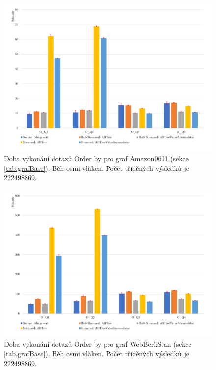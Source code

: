 \begin{figure}[!htp]
\includegraphics[width=\linewidth]{../img/amazonOrderByPar.pdf}\centering
\caption{Doba vykonání dotazů Order by pro graf Amazon0601 (sekce \ref{tab.grafBase}).  Běh osmi vláken. Počet tříděných výsledků je 222498869.}
\label{figure.amazonOrderPar}
\end{figure}

\begin{figure}[!htp]
\includegraphics[width=\linewidth]{../img/webberkstanOrderByPar.pdf}\centering
\caption{Doba vykonání dotazů Order by pro graf WebBerkStan (sekce \ref{tab.grafBase}).  Běh osmi vláken. Počet tříděných výsledků je 222498869.}
\label{figure.webberkstanOrderPar}
\end{figure}

\clearpage

